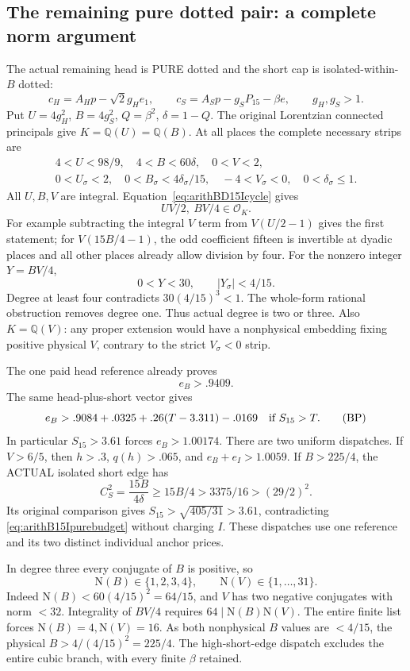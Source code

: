 \documentclass[11pt]{article}
\begin{document}
\subsection{The remaining pure dotted pair: a complete norm argument}
\label{app:arithB15Ipurepair}

The actual remaining head is PURE dotted and the short
cap is isolated-within-\(B\) dotted:
\[
 c_H=A_Hp-\sqrt2g_He_1,\qquad
 c_S=A_Sp-g_SP_{15}-\beta e,\qquad g_H,g_S>1 .
\]
Put \(U=4g_H^2\), \(B=4g_S^2\), \(Q=\beta^2\),
\(\delta=1-Q\).
The original Lorentzian connected principals give
\(K=\mathbb Q(U)=\mathbb Q(B)\).
At all places the complete necessary strips are
\[
 \begin{gathered}
 4<U<98/9,\quad 4<B<60\delta,\quad 0<V<2,\\
 0<U_\sigma<2,\quad
 0<B_\sigma<4\delta_\sigma/15,\quad
 -4<V_\sigma<0,\quad 0<\delta_\sigma\le1 .
 \end{gathered}
\]
All \(U,B,V\) are integral.
Equation~\eqref{eq:arithBD15Icycle} gives
\[
                       UV/2,\ BV/4\in\mathcal O_K.
\]
For example subtracting the integral \(V\) term
from \(V(U/2-1)\) gives the first statement;
for \(V(15B/4-1)\), the odd coefficient fifteen
is invertible at dyadic places and all other
places already allow division by four.
For the nonzero integer \(Y=BV/4\),
\[
             0<Y<30,\qquad |Y_\sigma|<4/15 .
\]
Degree at least four contradicts
\(30(4/15)^3<1\).
The whole-form rational obstruction removes degree one.
Thus actual degree is two or three.
Also \(K=\mathbb Q(V)\): any proper extension would have
a nonphysical embedding fixing positive physical \(V\),
contrary to the strict \(V_\sigma<0\) strip.

The one paid head reference already proves
\[
                         e_B>.9409 .
\]
The same head-plus-short vector gives
\[
                 e_B>.9084+.0325+.26(T-3.311)-.0169
              \quad\hbox{if }S_{15}>T .
\tag{BP}\label{eq:arithB15Ipurebudget}
\]
In particular \(S_{15}>3.61\) forces \(e_B>1.00174\).
There are two uniform dispatches.
If \(V>6/5\), then \(h>.3\), \(q(h)>.065\),
and \(e_B+e_I>1.0059\).
If \(B>225/4\), the ACTUAL isolated short edge has
\[
 C_S^2={\frac{15B}{4\delta}}\ge15B/4>3375/16>(29/2)^2 .
\]
Its original comparison gives
\(S_{15}>\sqrt{405/31}>3.61\), contradicting
\eqref{eq:arithB15Ipurebudget} without charging \(I\).
These dispatches use one reference and its two distinct
individual anchor prices.

In degree three every conjugate of \(B\) is positive, so
\[
        \mathrm N(B)\in\{1,2,3,4\},\qquad
        \mathrm N(V)\in\{1,\ldots,31\}.
\]
Indeed \(\mathrm N(B)<60(4/15)^2=64/15\),
and \(V\) has two negative conjugates with norm \(<32\).
Integrality of \(BV/4\) requires
\(64\mid\mathrm N(B)\mathrm N(V)\).
The entire finite list forces
\(\mathrm N(B)=4,\mathrm N(V)=16\).
As both nonphysical \(B\) values are \(<4/15\),
the physical \(B>4/(4/15)^2=225/4\).
The high-short-edge dispatch excludes the entire
cubic branch, with every finite \(\beta\) retained.
\end{document}
